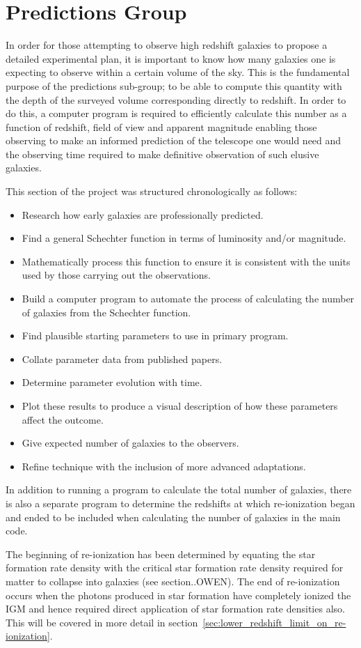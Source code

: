 
\section{Predictions Group} %
\label{sec:predictions_group}
	In order for those attempting to observe high redshift galaxies to propose a detailed experimental plan, it is important to know how many galaxies one is expecting to observe within a certain volume of the sky. This is the fundamental purpose of the predictions sub-group; to be able to compute this quantity with the depth of the surveyed volume corresponding directly to redshift. In order to do this, a computer program is required to efficiently calculate this number as a function of redshift, field of view and apparent magnitude enabling those observing to make an informed prediction of the telescope one would need and the observing time required to make definitive observation of such elusive galaxies.

	This section of the project was structured chronologically as follows:
	\begin{itemize}
		\item Research how early galaxies are professionally predicted.
		\item Find a general Schechter function in terms of luminosity and/or magnitude.
		\item Mathematically process this function to ensure it is consistent with the units used by those carrying out the observations.
		\item Build a computer program to automate the process of calculating the number of galaxies from the Schechter function.
		\item Find plausible starting parameters to use in primary program.
		\item Collate parameter data from published papers.
		\item Determine parameter evolution with time.
		\item Plot these results to produce a visual description of how these parameters affect the outcome.
		\item Give expected number of galaxies to the observers.
		\item Refine technique with the inclusion of more advanced adaptations.
	\end{itemize}

	In addition to running a program to calculate the total number of galaxies, there is also a separate program to determine the redshifts at which re-ionization began and ended to be included when calculating the number of galaxies in the main code.

	The beginning of re-ionization has been determined by equating the star formation rate density with the critical star formation rate density required for matter to collapse into galaxies (see section..OWEN). The end of re-ionization occurs when the photons produced in star formation have completely ionized the IGM and hence required direct application of star formation rate densities also. This will be covered in more detail in section~\ref{sec:lower_redshift_limit_on_re-ionization}.

